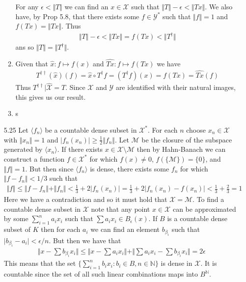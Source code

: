 \documentclass[11pt,letter]{article}
\begin{document}
\begin{enumerate}
\begin{enumerate}
        For any $\epsilon < \Vert T \Vert $ we can find an $x \in \mathcal{X}$ such that $\Vert T \Vert - \epsilon < \Vert Tx \Vert$. We also have, by Prop 5.8, that there exists some $f \in \mathcal{Y}^*$ such that $\Vert f \Vert = 1$ and  $f(Tx) = \Vert Tx \Vert$. Thus
        \begin{align*}
            \Vert T \Vert - \epsilon < \Vert Tx \Vert = f(Tx) < \Vert T^\dagger \Vert
        \end{align*}
        ans so $\Vert T \Vert = \Vert T^\dagger \Vert$.

        \item Given that $\hat{x}: f \mapsto f(x)$ and $\widehat{Tx}: f\mapsto f(Tx)$ we have
        \begin{align*}
            T^{\dagger\dagger}(\hat{x})(f) = \hat{x} \circ T^\dagger f = (T^\dagger f)(x) = f(Tx) = \widehat{Tx}(f)
        \end{align*}
        Thus $T^{\dagger\dagger} \vert \widehat{\mathcal{X}} = T$. Since $\mathcal{X}$ and $\mathcal{Y}$ are identified with their natural images, this gives us our result.

        \item s
        
    \end{enumerate}
    
    \item [5.25] Let $\langle f_n \rangle $ be a countable dense subset in $\mathcal{X}^*$. For each $n$ choose $x_n \in \mathcal{X}$ with $\Vert x_n \Vert = 1$ and $\vert f_n(x_n) \vert \ge \frac{1}{2} \Vert f_n \Vert$. Let $\mathcal{M}$ be the closure of the subspace generated by $\langle x_n \rangle$. If there exists $x \in \mathcal{X} \setminus \mathcal{M}$ then by Hahn-Banach we can construct a function $f \in \mathcal{X}^*$ for which $f(x) \ne 0$, $f(\{\mathcal{M}\}) = \{0\}$, and $\Vert f \Vert = 1$. But then since $\langle f_n \rangle$ is dense, there exists some $f_n$ for which $\Vert f - f_n \Vert < 1/3$ such that 
    \begin{align*}
        \Vert f \Vert \le \Vert f - f_n \Vert + \Vert f_n \Vert < \frac{1}{3} + 2 \vert f_n(x_n) \vert = \frac{1}{3} + 2 \vert f_n(x_n) - f(x_n) \vert < \frac{1}{3} + \frac{2}{3} = 1
    \end{align*}
    Here we have a contradiction and so it must hold that $\mathcal{X} = \mathcal{M}$. To find a countable dense subset in $\mathcal{X}$ note that any point $x \in \mathcal{X}$ can be approximated by some $\sum_{i=1}^n a_ix_i$ such that $\sum a_ix_i \in B_\epsilon(x)$. If $B$ is a countable dense subset of $K$ then for each $a_i$ we can find an element $b_{\beta_i}$ such that $\vert b_{\beta_i} - a_i \vert < \epsilon / n$. But then we have that
    \begin{align*}
        \Vert x - \sum b_{\beta_i}x_i \Vert \le \Vert x - \sum a_ix_i \Vert + \Vert \sum a_ix_i -\sum b_{\beta_i}x_i \Vert = 2\epsilon
    \end{align*}
    This means that the set $\{\sum_{i=1}^n b_i x_i: b_i \in B, n \in \mathbb N\}$ is dense in $\mathcal{X}$. It is countable since the set of all such linear combinations maps into $B^{\mathbb N}$.
\end{enumerate}
\end{document}
